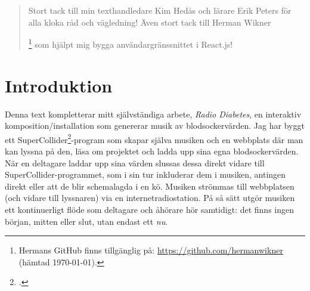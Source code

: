\documentclass[11pt, a4paper]{article} %
\newcommand{\symfootnote}[1]{%
\let\oldthefootnote=\thefootnote%
\stepcounter{mpfootnote}%
\addtocounter{footnote}{-1}%
\renewcommand{\thefootnote}{$\star$}%
\footnote{#1}%
\let\thefootnote=\oldthefootnote%
}
\begin{document}
\clearpage


\newpage

\renewcommand{\abstractname}{Tack}
\begin{abstract}
  \noindent
Stort tack till min texthandledare Kim Hedås och lärare Erik Peters för alla kloka råd och vägledning! Även stort tack till Herman Wikner\symfootnote{Hermans GitHub finns tillgänglig på: \url{https://github.com/hermanwikner} (hämtad \today).} som hjälpt mig bygga användargränssnittet i React.js! 
\end{abstract}
\thispagestyle{empty}
\clearpage


\begin{singlespace}
  \tableofcontents
\end{singlespace}

\clearpage

\section*{Introduktion}
Denna text kompletterar mitt självständiga arbete, \emph{Radio Diabetes}, en interaktiv komposition/installation som genererar musik av blodsockervärden. Jag har byggt ett SuperCollider\footcite{noauthor_supercollider_nodate}-program som skapar själva musiken och en webbplats där man kan lyssna på den, läsa om projektet och ladda upp sina egna blodsockervärden. När en deltagare laddar upp sina värden slussas dessa direkt vidare till SuperCollider-programmet, som i sin tur inkluderar dem i musiken, antingen direkt eller att de blir schemalagda i en kö. Musiken strömmas till webbplatsen (och vidare till lyssnaren) via en internetradiostation. På så sätt utgör musiken ett kontinuerligt flöde som deltagare och åhörare hör samtidigt: det finns ingen början, mitten eller slut, utan endast ett \emph{nu}. %

\end{document}
